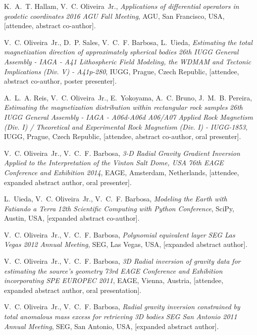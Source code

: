 \begin{thebibliography}{10}
K.~A.~T. Hallam, V.~C. Oliveira~Jr., \emph{Applications of differential
  operators in geodetic coordinates} \bblin{} \emph{2016 AGU Fall Meeting},
  AGU, San Francisco, USA, [attendee, abstract co-author].

V.~C. Oliveira~Jr., D.~P. Sales, V.~C.~F. Barbosa, L.~Uieda, \emph{Estimating
  the total magnetization direction of approximately spherical bodies} \bblin{}
  \emph{26th IUGG General Assembly - IAGA - A41 Lithospheric Field Modeling,
  the WDMAM and Tectonic Implications (Div. V) - A41p-280}, IUGG, Prague, Czech
  Republic, [attendee, abstract co-author, poster presenter].

A.~L.~A. Reis, V.~C. Oliveira~Jr., E.~Yokoyama, A.~C. Bruno, J.~M.~B. Pereira,
  \emph{Estimating the magnetization distribution within rectangular rock
  samples} \bblin{} \emph{26th IUGG General Assembly - IAGA - A06d-A06d A06/A07
  Applied Rock Magnetism (Div. I) / Theoretical and Experimental Rock Magnetism
  (Div. I) - IUGG-1853}, IUGG, Prague, Czech Republic, [attendee, abstract
  co-author, oral presenter].

V.~C. Oliveira~Jr., V.~C.~F. Barbosa, \emph{3-D Radial Gravity Gradient
  Inversion Applied to the Interpretation of the Vinton Salt Dome, USA}
  \bblin{} \emph{76th EAGE Conference and Exhibition 2014}, EAGE, Amsterdam,
  Netherlands, [attendee, expanded abstract author, oral presenter].

L.~Uieda, V.~C. Oliveira~Jr., V.~C.~F. Barbosa, \emph{Modeling the Earth with
  Fatiando a Terra} \bblin{} \emph{12th Scientific Computing with Python
  Conference}, SciPy, Austin, USA, [expanded abstract co-author].

V.~C. Oliveira~Jr., V.~C.~F. Barbosa, \emph{Polynomial equivalent layer}
  \bblin{} \emph{SEG Las Vegas 2012 Annual Meeting}, SEG, Las Vegas, USA,
  [expanded abstract author].

V.~C. Oliveira~Jr., V.~C.~F. Barbosa, \emph{3D Radial inversion of gravity data
  for estimating the source's geometry} \bblin{} \emph{73rd EAGE Conference and
  Exhibition incorporating SPE EUROPEC 2011}, EAGE, Vienna, Austria, [attendee,
  expanded abstract author, oral presentation].

V.~C. Oliveira~Jr., V.~C.~F. Barbosa, \emph{Radial gravity inversion
  constrained by total anomalous mass excess for retrieving 3D bodies} \bblin{}
  \emph{SEG San Antonio 2011 Annual Meeting}, SEG, San Antonio, USA, [expanded
  abstract author].

\end{thebibliography}


